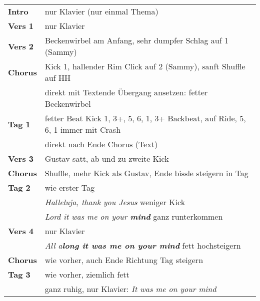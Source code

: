 
\begin{tabular}{p{1.6cm}l}
	\textbf{Intro}  & nur Klavier (nur einmal Thema)                                                  \\
	\textbf{Vers 1} & nur Klavier                                                                     \\
	\textbf{Vers 2} & Beckenwirbel am Anfang, sehr dumpfer Schlag auf 1 (Sammy)                       \\
	\textbf{Chorus} & Kick 1, hallender Rim Click auf 2 (Sammy), sanft Shuffle auf HH                 \\
	                & direkt mit Textende Übergang ansetzen: fetter Beckenwirbel                      \\
	\textbf{Tag 1}  & fetter Beat Kick 1, 3+, 5, 6, 1, 3+ Backbeat, auf Ride, 5, 6, 1 immer mit Crash \\
	                & direkt nach Ende Chorus (Text)                                                  \\
	\textbf{Vers 3} & Gustav satt, ab und zu zweite Kick                                              \\
	\textbf{Chorus} & Shuffle, mehr Kick als Gustav, Ende bissle steigern in Tag                      \\
	\textbf{Tag 2}  & wie erster Tag                                                                  \\
	                & \textit{Halleluja, thank you Jesus} weniger Kick                                \\
	                & \textit{Lord it was me on your \textbf{mind}} ganz runterkommen                 \\
	\textbf{Vers 4} & nur Klavier                                                                     \\
	                & \textit{All a\textbf{long it was me on your mind}} fett hochsteigern            \\
	\textbf{Chorus} & wie vorher, auch Ende Richtung Tag steigern                                     \\
	\textbf{Tag 3}  & wie vorher, ziemlich fett                                                       \\
	                & ganz ruhig, nur Klavier: \textit{It was me on your mind}                        \\
\end{tabular}
